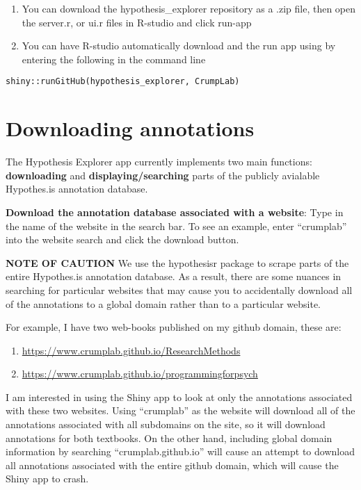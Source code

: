 \documentclass[]{book}
\providecommand{\tightlist}{%
  \setlength{\itemsep}{0pt}\setlength{\parskip}{0pt}}
\theoremstyle{definition}
\theoremstyle{definition}
\theoremstyle{definition}
\theoremstyle{remark}
\begin{document}
\begin{enumerate}
\def\labelenumi{\arabic{enumi}.}
\item
  You can download the hypothesis\_explorer repository as a .zip file,
  then open the server.r, or ui.r files in R-studio and click run-app
\item
  You can have R-studio automatically download and the run app using by
  entering the following in the command line
\end{enumerate}

\texttt{shiny::runGitHub(\textquotesingle{}hypothesis\_explorer\textquotesingle{},\ \textquotesingle{}CrumpLab\textquotesingle{})}

\section{Downloading annotations}\label{downloading-annotations}

The Hypothesis Explorer app currently implements two main functions:
\textbf{downloading} and \textbf{displaying/searching} parts of the
publicly avialable Hypothes.is annotation database.

\textbf{Download the annotation database associated with a website}:
Type in the name of the website in the search bar. To see an example,
enter ``crumplab'' into the website search and click the download
button.

\textbf{NOTE OF CAUTION} We use the hypothesisr package to scrape parts
of the entire Hypothes.is annotation database. As a result, there are
some nuances in searching for particular websites that may cause you to
accidentally download all of the annotations to a global domain rather
than to a particular website.

For example, I have two web-books published on my github domain, these
are:

\begin{enumerate}
\def\labelenumi{\arabic{enumi}.}
\tightlist
\item
  \url{https://www.crumplab.github.io/ResearchMethods}
\item
  \url{https://www.crumplab.github.io/programmingforpsych}
\end{enumerate}

I am interested in using the Shiny app to look at only the annotations
associated with these two websites. Using ``crumplab'' as the website
will download all of the annotations associated with all subdomains on
the site, so it will download annotations for both textbooks. On the
other hand, including global domain information by searching
``crumplab.github.io'' will cause an attempt to download all annotations
associated with the entire github domain, which will cause the Shiny app
to crash.
\end{document}
